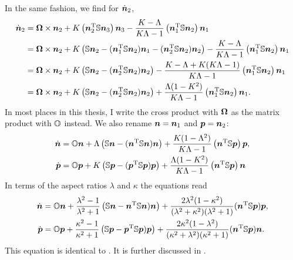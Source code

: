 \documentclass[thesis.tex]{subfiles}
\begin{document}
In the same fashion, we find for $\dot{\ve n}_2$,
\begin{align*}
	\dot{\ve n}_2
	&= \ve \Omega \cross \ve n_2
	 + K\left(\ve n_2\transpose \ma S\ve n_3\right)\ve n_3
	  - \frac{K- \Lambda}{K \Lambda - 1}\left(\ve n_1\transpose \ma S\ve n_2\right)\ve n_1 \\
	&= \ve \Omega \cross \ve n_2
	 + K\left(
\ma S \ve n_2 - (\ve n_1 \transpose \ma S \ve n_2) \ve n_1 - (\ve n_2 \transpose \ma S \ve n_2) \ve n_2
	 \right)
	  - \frac{K- \Lambda}{K \Lambda - 1}\left(\ve n_1\transpose \ma S\ve n_2\right)\ve n_1 \\
	&= \ve \Omega \cross \ve n_2
	 + K\left(
\ma S \ve n_2  - (\ve n_2 \transpose \ma S \ve n_2) \ve n_2
	 \right)
	  - \frac{K- \Lambda + K(K \Lambda - 1)}{K \Lambda - 1}\left(\ve n_1\transpose \ma S\ve n_2\right)\ve n_1\\
	&= \ve \Omega \cross \ve n_2
	 + K\left(
\ma S \ve n_2  - (\ve n_2 \transpose \ma S \ve n_2) \ve n_2
	 \right)
	  + \frac{\Lambda(1-K^2)}{K \Lambda - 1}\left(\ve n_1\transpose \ma S\ve n_2\right)\ve n_1.
\end{align*}
In most places in this thesis, I write the cross product with $\ve \Omega$ as the matrix product with $\ma O$ instead. We also rename $\ve n = \ve n_1$ and $\ve p = \ve n_2$:
\begin{align*}
	\dot{\ve n}	&= \ma O \ve n 
	+ \Lambda\left(
	\ma S \ve n - (\ve n \transpose \ma S \ve n) \ve n
	\right)
    + \frac{K(1- \Lambda^2)}{K \Lambda - 1}\left(\ve n\transpose \ma S\ve p\right)\ve p, \\
\dot{\ve p}	&=    \ma O \ve p
	 + K\left(
\ma S \ve p  - (\ve p \transpose \ma S \ve p) \ve p
	 \right)
	  + \frac{\Lambda(1-K^2)}{K \Lambda - 1}\left(\ve n\transpose \ma S\ve p\right)\ve n
\end{align*}
In terms of the aspect ratios $\lambda$ and $\kappa$ the equations read
\begin{align*}
	\dot{\ve n} &= \ma O \ve{n} + \frac{\lambda^2-1}{\lambda^2+1} \left(\ma S \ve n- \ve{n}\transpose \ma S \ve{n})\ve{n}\right) + \frac{ 2\lambda^2 (1 - \kappa^2) }{(\lambda^2+\kappa^2)(\lambda^2+1)}(\ve{n}\transpose \ma S \ve{p})\ve{p}, \nn\\
	\dot{\ve p} &= \ma O \ve{p} + \frac{\kappa^2-1}{\kappa^2+1}\left(\ma S \ve p - \ve{p}\transpose \ma S \ve{p})\ve{p}\right) + \frac{ 2\kappa^2 (1 - \lambda^2) }{(\kappa^2+\lambda^2)(\kappa^2+1)}(\ve{n}\transpose \ma S \ve{p})\ve{n}.
\end{align*}
This equation is identical to . It is further discussed in .
\end{document}
